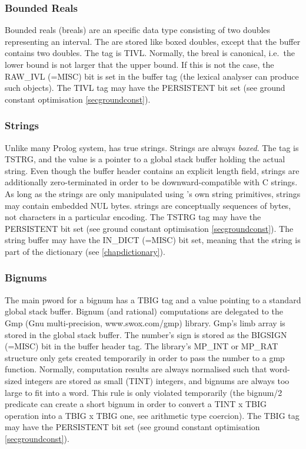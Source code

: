\subsubsection{Bounded Reals}
Bounded reals (breals) are an {\eclipse} specific data type consisting
of two doubles representing an interval.  The are stored like
boxed doubles, except that the buffer contains two doubles.
The tag is TIVL.  Normally, the breal is canonical, i.e.\ the lower bound
is not larger that the upper bound.  If this is not the case, the
RAW_IVL  (=MISC) bit  is set in the buffer tag (the lexical analyser can
produce such objects).
The TIVL tag may have the PERSISTENT bit set (see ground constant optimisation
\ref{secgroundconst}).

\subsubsection{Strings}
Unlike many Prolog system, {\eclipse} has true strings.
Strings  are always {\it boxed}. The tag is TSTRG, and the value is a pointer
to a global stack buffer holding the actual string.
Even though the buffer header contains an explicit length field,
strings are additionally zero-terminated in order to be
downward-compatible with C strings.  As long as the strings are only
manipulated using {\eclipse}'s own string primitives, strings may
contain embedded NUL  bytes.  {\eclipse} strings are conceptually
sequences of bytes, not characters in a particular encoding.
The TSTRG tag may have the PERSISTENT bit set (see ground constant optimisation
\ref{secgroundconst}).
The string buffer may have the IN_DICT  (=MISC) bit set, meaning that the
string is part of the dictionary (see \ref{chapdictionary}).


\subsubsection{Bignums}
The main pword for a bignum has a TBIG  tag and a value pointing to a
standard global stack buffer. 
Bignum  (and rational) computations are delegated to the Gmp  (Gnu
multi-precision, www.swox.com/gmp) library.  Gmp's limb array is stored
in the global stack buffer. The number's sign is stored as the BIGSIGN  (=MISC)
bit in the buffer header tag. The library's MP_INT  or MP_RAT  structure only
gets created temporarily in order to pass the number to a gmp
function.  Normally, computation results are always normalised such that
word-sized integers are stored as small (TINT) integers, and bignums are
always too large to fit into a word.  This rule is only violated
temporarily (the bignum/2 predicate can create a short bignum in order
to convert a TINT x TBIG operation into a TBIG x TBIG one, see arithmetic
type coercion).
The TBIG tag may have the PERSISTENT bit set (see ground constant optimisation
\ref{secgroundconst}).


